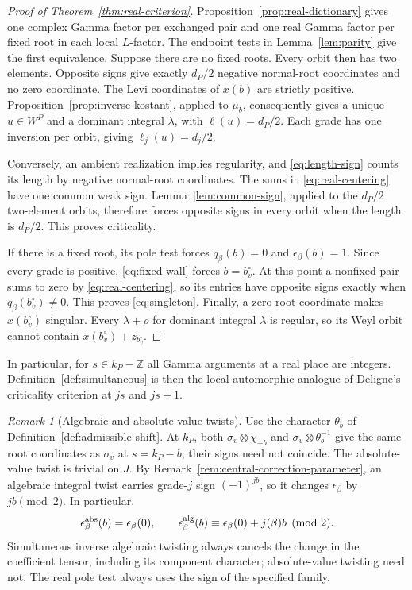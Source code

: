 \documentclass[12pt]{amsart}
\numberwithin{equation}{section}
\theoremstyle{plain}
\theoremstyle{definition}
\theoremstyle{remark}
\newtheorem{remark}[theorem]{Remark}
\newcommand{\Z}{\mathbb{Z}}
\begin{document}
\begin{proof}[Proof of Theorem~\ref{thm:real-criterion}]
Proposition~\ref{prop:real-dictionary} gives one complex Gamma factor per exchanged pair and one real Gamma factor per fixed root in each local $L$-factor. The endpoint tests in Lemma~\ref{lem:parity} give the first equivalence. Suppose there are no fixed roots. Every orbit then has two elements. Opposite signs give exactly $d_P/2$ negative normal-root coordinates and no zero coordinate. The Levi coordinates of $x(b)$ are strictly positive. Proposition~\ref{prop:inverse-kostant}, applied to $\mu_b$, consequently gives a unique $u\in W^P$ and a dominant integral $\lambda$, with $\ell(u)=d_P/2$. Each grade has one inversion per orbit, giving $\ell_j(u)=d_j/2$.

Conversely, an ambient realization implies regularity, and \eqref{eq:length-sign} counts its length by negative normal-root coordinates. The sums in \eqref{eq:real-centering} have one common weak sign. Lemma~\ref{lem:common-sign}, applied to the $d_P/2$ two-element orbits, therefore forces opposite signs in every orbit when the length is $d_P/2$. This proves criticality. 

If there is a fixed root, its pole test forces $q_\beta(b)=0$ and $\epsilon_\beta(b)=1$. Since every grade is positive, \eqref{eq:fixed-wall} forces $b=b_v^\circ$. At this point a nonfixed pair sums to zero by \eqref{eq:real-centering}, so its entries have opposite signs exactly when $q_\beta(b_v^\circ)\ne0$. This proves \eqref{eq:singleton}. Finally, a zero root coordinate makes $x(b_v^\circ)$ singular. Every $\lambda+\rho$ for dominant integral $\lambda$ is regular, so its Weyl orbit cannot contain $x(b_v^\circ)+z_{b_v^\circ}$. 
\end{proof}

In particular, for $s\in k_P-\Z$ all Gamma arguments at a real place are integers. Definition~\ref{def:simultaneous} is then the local automorphic analogue of Deligne's criticality criterion \cite[Def.~1.3]{Deligne1979} at $js$ and $js+1$. 

\begin{remark}[Algebraic and absolute-value twists]\label{rem:twist-families}
Use the character $\theta_b$ of Definition~\ref{def:admissible-shift}. At $k_P$, both $\sigma_v\otimes\chi_{-b}$ and $\sigma_v\otimes\theta_b^{-1}$ give the same root coordinates as $\sigma_v$ at $s=k_P-b$; their signs need not coincide. The absolute-value twist is trivial on $J$. By Remark~\ref{rem:central-correction-parameter}, an algebraic integral twist carries grade-$j$ sign $(-1)^{jb}$, so it changes $\epsilon_\beta$ by $jb\pmod2$. In particular,
\[
 \epsilon_\beta^{\rm abs}(b)=\epsilon_\beta(0),\qquad
 \epsilon_\beta^{\rm alg}(b)\equiv\epsilon_\beta(0)+j(\beta)b\pmod2 .
\]
Simultaneous inverse algebraic twisting always cancels the change in the coefficient tensor, including its component character; absolute-value twisting need not. The real pole test always uses the sign of the specified family. 
\end{remark}
\end{document}
